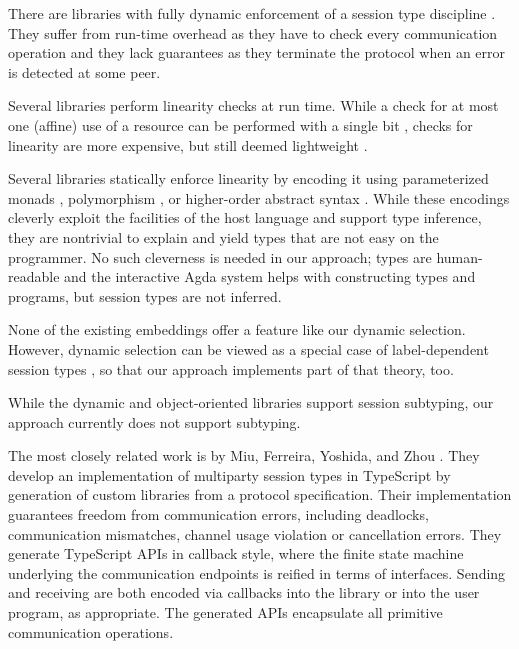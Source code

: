 \documentclass[acmsmall,screen]{acmart}
\begin{document}


There are libraries with fully dynamic enforcement of a session type
discipline
\cite{DBLP:conf/rv/HuNYDH13,DBLP:journals/pacmpl/MelgrattiP17}. They
suffer from run-time overhead as they have to check every
communication operation and they lack guarantees as they terminate the
protocol when an error is detected at some peer. 

Several libraries perform
linearity checks at run time. While a check for at most one (affine)
use of a resource can be performed with a single bit
\cite{DBLP:conf/esop/TovP10},  checks for linearity are more
expensive, but still deemed lightweight
\cite{DBLP:conf/fase/HuY16}.

Several libraries statically enforce linearity by encoding it
using parameterized monads
\cite{SackmanE08,DBLP:conf/haskell/PucellaT08},  polymorphism
\cite{DBLP:journals/scp/ImaiYY19}, or higher-order 
abstract syntax \cite{DBLP:conf/haskell/LindleyM16}. While these
encodings cleverly exploit the facilities of the host language and
support type inference, they
are nontrivial to explain and yield types that are not easy on the
programmer. No such cleverness is needed in our approach; types are
human-readable and the interactive Agda system helps with constructing
types and programs, but session types are not inferred.

None of the existing embeddings offer a feature like our dynamic
selection. However, dynamic selection can be viewed as a special case
of label-dependent session types
\cite{DBLP:journals/pacmpl/ThiemannV20}, so that our  approach
implements part of that theory, too.

While the dynamic and object-oriented libraries support session
subtyping, our approach currently does not support subtyping. 


The most closely related work is by Miu, Ferreira, Yoshida, and Zhou
\cite{DBLP:conf/cc/Miu0Y021}. They develop an
implementation of multiparty session types in TypeScript by generation
of custom libraries from a protocol specification. Their
implementation guarantees freedom from
communication errors, including deadlocks, communication
mismatches, channel usage violation or cancellation errors. They
generate TypeScript APIs in callback style, where the finite state
machine underlying the communication endpoints is reified in terms of
interfaces. Sending and receiving are both encoded via callbacks 
into the library or into the user program, as appropriate. The
generated APIs encapsulate all primitive communication operations.
\end{document}
